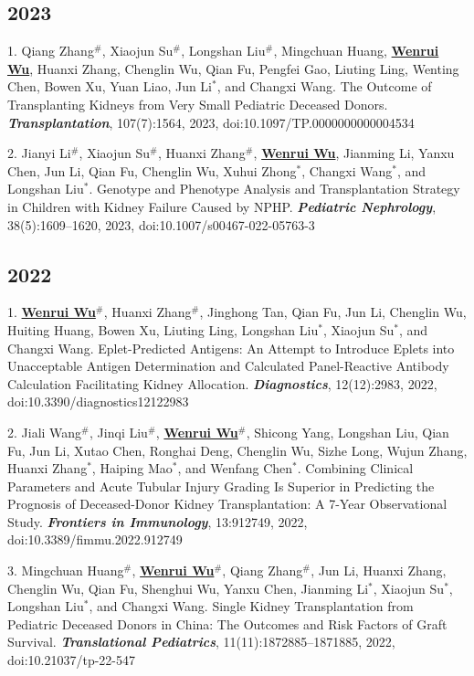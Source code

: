 \documentclass{article}
\begin{document}
\subsection*{2023}

1. Qiang Zhang$^{\#}$, Xiaojun Su$^{\#}$, Longshan Liu$^{\#}$, Mingchuan Huang, \underline{\textbf{Wenrui Wu}}, Huanxi Zhang, Chenglin Wu, Qian Fu, Pengfei Gao, Liuting Ling, Wenting Chen, Bowen Xu, Yuan Liao, Jun Li$^{*}$, and Changxi Wang. The Outcome of Transplanting Kidneys from Very Small Pediatric Deceased Donors. \textbf{\textit{Transplantation}}, 107(7):1564, 2023, doi:10.1097/TP.0000000000004534

2. Jianyi Li$^{\#}$, Xiaojun Su$^{\#}$, Huanxi Zhang$^{\#}$, \underline{\textbf{Wenrui Wu}}, Jianming Li, Yanxu Chen, Jun Li, Qian Fu, Chenglin Wu, Xuhui Zhong$^{*}$, Changxi Wang$^{*}$, and Longshan Liu$^{*}$. Genotype and Phenotype Analysis and Transplantation Strategy in Children with Kidney Failure Caused by NPHP. \textbf{\textit{Pediatric Nephrology}}, 38(5):1609–1620, 2023, doi:10.1007/s00467-022-05763-3

\subsection*{2022}

1. \underline{\textbf{Wenrui Wu}}$^{\#}$, Huanxi Zhang$^{\#}$, Jinghong Tan, Qian Fu, Jun Li, Chenglin Wu, Huiting Huang, Bowen Xu, Liuting Ling, Longshan Liu$^{*}$, Xiaojun Su$^{*}$, and Changxi Wang. Eplet-Predicted Antigens: An Attempt to Introduce Eplets into Unacceptable Antigen Determination and Calculated Panel-Reactive Antibody Calculation Facilitating Kidney Allocation. \textbf{\textit{Diagnostics}}, 12(12):2983, 2022, doi:10.3390/diagnostics12122983

2. Jiali Wang$^{\#}$, Jinqi Liu$^{\#}$, \underline{\textbf{Wenrui Wu}}$^{\#}$, Shicong Yang, Longshan Liu, Qian Fu, Jun Li, Xutao Chen, Ronghai Deng, Chenglin Wu, Sizhe Long, Wujun Zhang, Huanxi Zhang$^{*}$, Haiping Mao$^{*}$, and Wenfang Chen$^{*}$. Combining Clinical Parameters and Acute Tubular Injury Grading Is Superior in Predicting the Prognosis of Deceased-Donor Kidney Transplantation: A 7-Year Observational Study. \textbf{\textit{Frontiers in Immunology}}, 13:912749, 2022, doi:10.3389/fimmu.2022.912749

3. Mingchuan Huang$^{\#}$, \underline{\textbf{Wenrui Wu}}$^{\#}$, Qiang Zhang$^{\#}$, Jun Li, Huanxi Zhang, Chenglin Wu, Qian Fu, Shenghui Wu, Yanxu Chen, Jianming Li$^{*}$, Xiaojun Su$^{*}$, Longshan Liu$^{*}$, and Changxi Wang. Single Kidney Transplantation from Pediatric Deceased Donors in China: The Outcomes and Risk Factors of Graft Survival. \textbf{\textit{Translational Pediatrics}}, 11(11):1872885–1871885, 2022, doi:10.21037/tp-22-547
\end{document}
